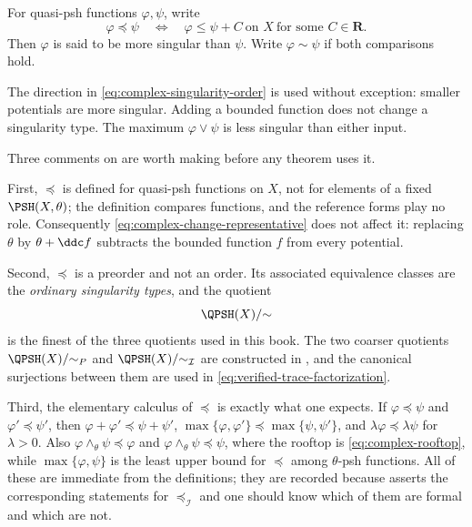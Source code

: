 \begin{definition}
\label{def:complex-singularity-order}
For quasi-psh functions \(\varphi,\psi\), write
\[
 \varphi\preceq\psi
 \quad\Longleftrightarrow\quad
 \varphi\leq\psi+C\ \text{on }X\ \text{for some }C\in\mathbf R.
\tag{51.4}\label{eq:complex-singularity-order}
\]
Then \(\varphi\) is said to be more singular than \(\psi\).
Write \(\varphi\sim\psi\) if both comparisons hold.
\end{definition}

The direction in \eqref{eq:complex-singularity-order} is used without
exception: smaller potentials are more singular.  Adding a bounded
function does not change a singularity type.  The maximum
\(\varphi\vee\psi\) is less singular than either input.

Three comments on  are worth making
before any theorem uses it.

First, \(\preceq\) is defined for quasi-psh functions on \(X\), not for
elements of a fixed \(\PSH(X,\theta)\); the definition compares functions,
and the reference forms play no role.  Consequently
\eqref{eq:complex-change-representative} does not affect it: replacing
\(\theta\) by \(\theta+\ddc f\) subtracts the bounded function \(f\) from
every potential.

Second, \(\preceq\) is a preorder and not an order.  Its associated
equivalence classes are the \emph{ordinary singularity types}, and the
quotient
\[
 \QPSH(X)/{\sim}
\]
is the finest of the three quotients used in this book.  The two coarser
quotients \(\QPSH(X)/{\sim_P}\) and \(\QPSH(X)/{\sim_{\mathcal I}}\) are
constructed in , and the
canonical surjections between them are used in
\eqref{eq:verified-trace-factorization}.

Third, the elementary calculus of \(\preceq\) is exactly what one expects.
If \(\varphi\preceq\psi\) and \(\varphi'\preceq\psi'\), then
\(\varphi+\varphi'\preceq\psi+\psi'\),
\(\max\{\varphi,\varphi'\}\preceq\max\{\psi,\psi'\}\), and
\(\lambda\varphi\preceq\lambda\psi\) for \(\lambda>0\).  Also
\(\varphi\wedge_\theta\psi\preceq\varphi\) and
\(\varphi\wedge_\theta\psi\preceq\psi\), where the rooftop is
\eqref{eq:complex-rooftop}, while
\(\max\{\varphi,\psi\}\) is the least upper bound for \(\preceq\) among
\(\theta\)-psh functions.  All of these are immediate from the
definitions; they are recorded because
 asserts the corresponding
statements for \(\preceq_{\mathcal I}\) and one should know which of them
are formal and which are not.

